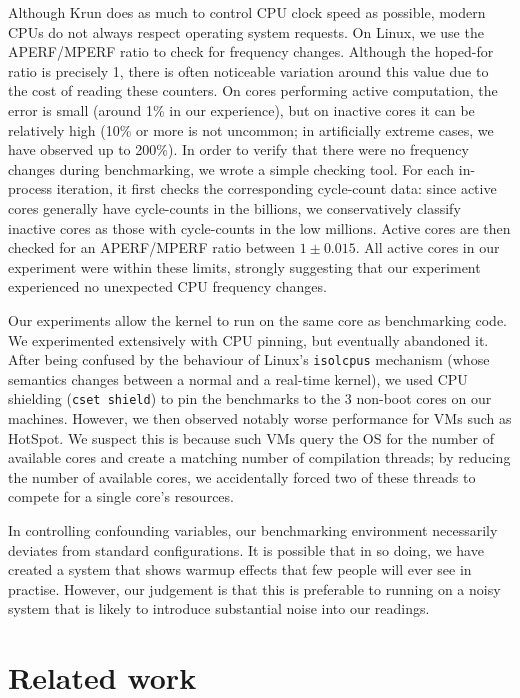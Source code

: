 \documentclass[preprint,numbers,10pt]{sigplanconf}
\newcommand{\krun}{Krun\xspace}
\begin{document}
Although \krun does as much to control CPU clock speed as possible, modern CPUs
do not always respect operating system requests. On Linux, we use the
APERF/MPERF ratio to check for frequency changes. Although the hoped-for
ratio is precisely 1, there is often noticeable variation around this value due to the
cost of reading these counters. On cores
performing active computation, the error is small (around 1\% in our
experience), but on inactive cores it can be relatively high (10\% or more is
not uncommon; in artificially extreme cases, we have observed up to 200\%).
In order to verify that there were no frequency changes during benchmarking,
we wrote a simple checking tool. For each in-process iteration, it first checks
the corresponding cycle-count data: since active cores generally have
cycle-counts in the billions, we conservatively classify inactive
cores as those with cycle-counts in the low millions. Active cores are then
checked for an APERF/MPERF ratio between $1 \pm 0.015$. All active cores in our
experiment were within these limits, strongly suggesting that our experiment
experienced no unexpected CPU frequency changes.

Our experiments allow the kernel to run on the same core as benchmarking code.
We experimented extensively with CPU pinning, but eventually abandoned it. After
being confused by the behaviour of Linux's \texttt{isolcpus} mechanism (whose
semantics changes between a normal and a real-time kernel), we used CPU shielding
(\texttt{cset shield}) to pin the benchmarks to the 3 non-boot cores on our
machines. However, we then observed notably worse performance for VMs such as
HotSpot. We suspect this is because such VMs query the OS for the number of
available cores and create a matching number of compilation threads; by reducing
the number of available cores, we accidentally forced two of these threads to
compete for a single core's resources.

In controlling confounding variables, our benchmarking environment necessarily
deviates from standard configurations. It is possible that in so doing, we have
created a system that shows warmup effects that few people will ever see in
practise. However, our judgement is that this is preferable to running on a
noisy system that is likely to introduce substantial noise into our readings.


\section{Related work}
\end{document}
